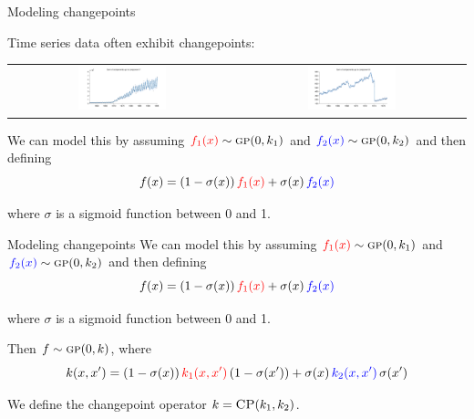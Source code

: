 \begin{frame}{Modeling changepoints}
  
  Time series data often exhibit changepoints:
  
  \begin{center}
  \begin{tabular}{cc}
    \includegraphics[width=0.4\textwidth]{figures/09-gas-production_7_cum} &
    \includegraphics[width=0.4\textwidth]{figures/07-call-centre_6_cum} 
  \end{tabular}
  \end{center}
  
  \pause

  We can model this by assuming $\textcolor{red}{f_1(x)} \sim {\textsc{gp}}{}(0,k_1)$ and $\textcolor{blue}{f_2(x)} \sim {\textsc{gp}}{}(0,k_2)$ and then defining
\[
f(x) = (1-\sigma(x))\, \textcolor{red}{f_1(x)} + \sigma(x)\, \textcolor{blue}{f_2(x)}
\]

where $\sigma$ is a sigmoid function between 0 and 1.
\end{frame}

\begin{frame}{Modeling changepoints}
  We can model this by assuming $\textcolor{red}{f_1(x)} \sim {\textsc{gp}}{}(0,k_1)$ and $\textcolor{blue}{f_2(x)} \sim {\textsc{gp}}{}(0,k_2)$ and then defining
\[
f(x) = (1-\sigma(x))\, \textcolor{red}{f_1(x)} + \sigma(x)\, \textcolor{blue}{f_2(x)}
\]

where $\sigma$ is a sigmoid function between 0 and 1.

\vspace{2\baselineskip}

Then $f \sim {\textsc{gp}}{}(0,k)$, where
\[
k(x,x') = (1-\sigma(x)) \, \textcolor{red}{k_1(x,x')}  \, (1-\sigma(x')) + \sigma(x) \,
\textcolor{blue}{k_2(x,x')} \, \sigma(x') 
\]

We define the changepoint operator $k = {\textsc{CP}}(k_1, k_2)$.

\end{frame}

